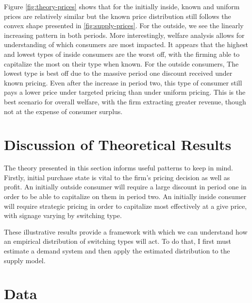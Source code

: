 \documentclass[12pt]{article}
\theoremstyle{definition}
\theoremstyle{remark}
\begin{document}
Figure \ref{fig:theory-prices} shows that for the initially inside, known and uniform prices are relatively similar but the known price distribution still follows the convex shape presented in \ref{fig:supply-prices}. For the outside, we see the linearly increasing pattern in both periods. More interestingly, welfare analysis allows for understanding of which consumers are most impacted. It appears that the highest and lowest types of inside consumers are the worst off, with the firming able to capitalize the most on their type when known. For the outside consumers, The lowest type is best off due to the massive period one discount received under known pricing. Even after the increase in period two, this type of consumer still pays a lower price under targeted pricing than under uniform pricing. This is the best scenario for overall welfare, with the firm extracting greater revenue, though not at the expense of consumer surplus.

\section{Discussion of Theoretical Results}
\label{sec:theory-discussion}

The theory presented in this section informs useful patterns to keep in mind. Firstly, initial purchase state is vital to the firm's pricing decision as well as profit. An initially outside consumer will require a large discount in period one in order to be able to capitalize on them in period two. An initially inside consumer will require strategic pricing in order to capitalize most effectively at a give price, with signage varying by switching type.

These illustrative results provide a framework with which we can understand how an empirical distribution of switching types will act. To do that, I first must estimate a demand system and then apply the estimated distribution to the supply model. 


\section{Data}
\label{sec:data}
\end{document}
